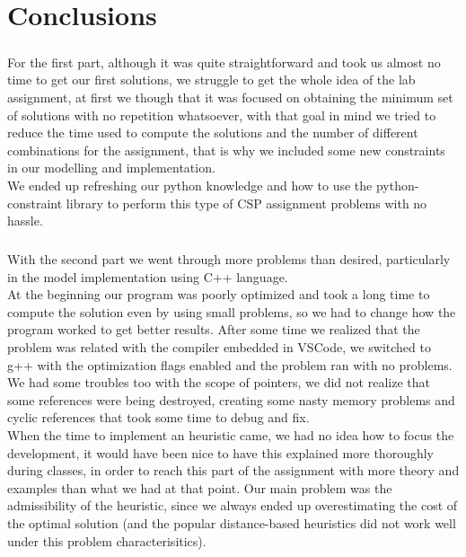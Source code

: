 \chapter{Conclusions}
\label{chapter: conclusions}

\paragraph{}
For the first part, although it was quite straightforward and took us almost no time to get our first solutions, we struggle to get the whole idea of the lab assignment, at first we though that it was focused on obtaining the minimum set of solutions with no repetition whatsoever, with that goal in mind we tried to reduce the time used to compute the solutions and the number of different combinations for the assignment, that is why we included some new constraints in our modelling and implementation.\\
We ended up refreshing our python knowledge and how to use the python-constraint library to perform this type of CSP assignment problems with no hassle.

\paragraph{}
With the second part we went through more problems than desired, particularly in the model implementation using C++ language.\\
At the beginning our program was poorly optimized and took a long time to compute the solution even by using small problems, so we had to change how the program worked to get better results. After some time we realized that the problem was related with the compiler embedded in VSCode, we switched to g++ with the optimization flags enabled and the problem ran with no problems.\\
We had some troubles too with the scope of pointers, we did not realize that some references were being destroyed, creating some nasty memory problems and cyclic references that took some time to debug and fix.\\
When the time to implement an heuristic came, we had no idea how to focus the development, it would have been nice to have this explained more thoroughly during classes, in order to reach this part of the assignment with more theory and examples than what we had at that point. Our main problem was the admissibility of the heuristic, since we always ended up overestimating the cost of the optimal solution (and the popular distance-based heuristics did not work well under this problem characterisitics).  

